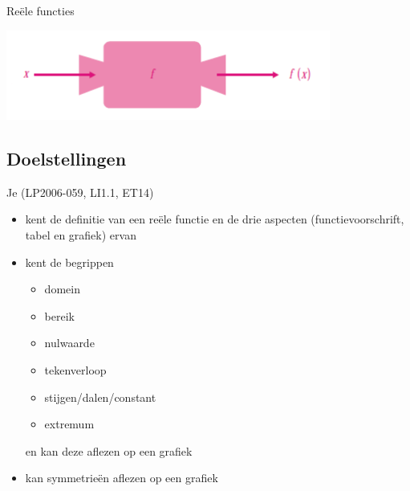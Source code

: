 \documentclass[12pt,twoside]{article}
\begin{document}
\pagestyle{fancy}
\lhead{}

\begin{theorie}
\thispagestyle{empty}
\begin{center}
  \begin{mdframed}
  \centering
  \fontsize{40}{60}\selectfont Reële functies
  \end{mdframed}
  \vfill
  \includegraphics[width=0.8\textwidth]{FunctieMachine}
  \vfill
\end{center}

\subsection*{Doelstellingen}
\vspace*{-0.8cm}
{\singlespacing
Je \hfill  {\scriptsize(LP2006-059, LI1.1, ET14)}
\begin{itemize}
  \itemsep-0.2em
  \item kent de definitie van een reële functie en de drie aspecten (functievoorschrift, tabel en grafiek) ervan
  \item kent de begrippen
  \begin{itemize}
    \item domein
    \item bereik
    \item nulwaarde
    \item tekenverloop
    \item stijgen/dalen/constant
    \item extremum
  \end{itemize}
  en kan deze aflezen op een grafiek
  \item kan symmetrieën aflezen op een grafiek
\end{itemize}}

\thispagestyle{empty}
\mbox{}
\newpage
\clearpage
\thispagestyle{empty}
\tableofcontents
\newpage
\clearpage
{} 

\fancyhead[RE,LO]{}

\end{theorie}

\onehalfspacing
\end{document}
